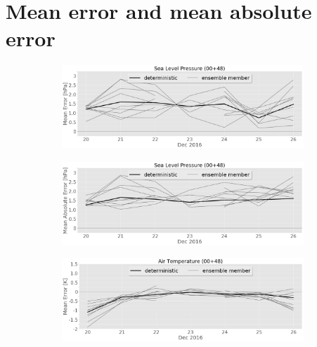 
\section{Mean error and mean absolute error}%
\label{app:mean_error}

\begin{figure}[h]%
	\centering
	\begin{subfigure}[b]{0.49\textwidth}
		\includegraphics[width=\textwidth]{./fig_sfc_pressure/ME_20161220_26_00}
		\caption{}\label{fig:bias:pres}
	\end{subfigure}
	\begin{subfigure}[b]{0.49\textwidth}
		\includegraphics[width=\textwidth]{./fig_sfc_pressure/MAE_20161220_26_00}
		\caption{}\label{fig:MAE:pres}
	\end{subfigure}
	\begin{subfigure}[b]{0.49\textwidth}
		\includegraphics[width=\textwidth]{./fig_sfc_temp/ME_20161220_26_00}
		\caption{}\label{fig:bias:temp}
	\end{subfigure}

\end{figure}
